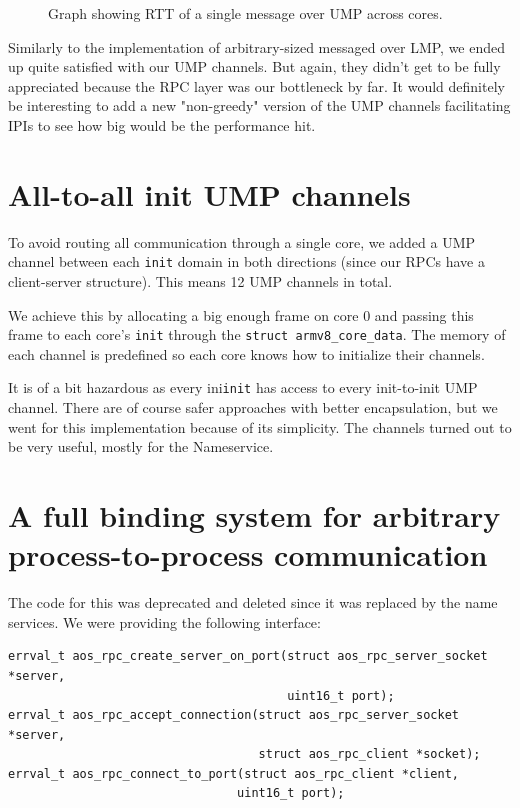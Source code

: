 \begin{figure}[ht]
    \centering
        \scalebox{0.8}{
            
        }
    \caption{Graph showing RTT of a single message over UMP across cores.}
    \label{fig:ump_rtt}
\end{figure}

\begin{hindsight}
Similarly to the implementation of arbitrary-sized messaged over LMP, we ended up quite satisfied with our UMP channels. But again, they didn't get to be fully appreciated because the RPC layer was our bottleneck by far. It would definitely be interesting to add a new "non-greedy" version of the UMP channels facilitating IPIs to see how big would be the performance hit.
\end{hindsight}

\section{All-to-all init UMP channels}
To avoid routing all communication through a single core, we added a UMP channel between each \texttt{init} domain in both directions (since our RPCs have a client-server structure). This means 12 UMP channels in total.

We achieve this by allocating a big enough frame on core 0 and passing this frame to each core's \texttt{init} through the \texttt{struct armv8_core_data}. The memory of each channel is predefined so each core knows how to initialize their channels.

It is of a bit hazardous as every ini\texttt{init} has access to every init-to-init UMP channel. There are of course safer approaches with better encapsulation, but we went for this implementation because of its simplicity. The channels turned out to be very useful, mostly for the Nameservice.

\section{A full binding system for arbitrary process-to-process communication}
\label{sec:full_binding_ump}

The code for this was deprecated and deleted since it was replaced by the name services.
We were providing the following interface:

\begin{verbatim}
errval_t aos_rpc_create_server_on_port(struct aos_rpc_server_socket *server,
                                       uint16_t port);
errval_t aos_rpc_accept_connection(struct aos_rpc_server_socket *server,
                                   struct aos_rpc_client *socket);
errval_t aos_rpc_connect_to_port(struct aos_rpc_client *client,
                                uint16_t port);
\end{verbatim}


